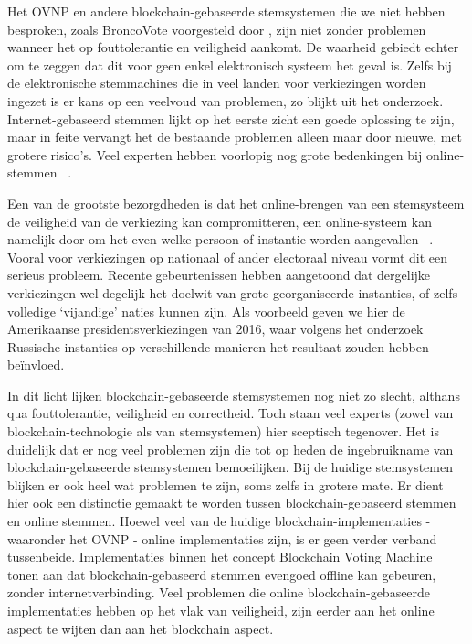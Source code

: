 	 Het OVNP en andere blockchain-gebaseerde stemsystemen die we niet hebben besproken, zoals BroncoVote voorgesteld door \textcite{Dagher2018}, zijn niet zonder problemen wanneer het op fouttolerantie en veiligheid aankomt. De waarheid gebiedt echter om te zeggen dat dit voor geen enkel elektronisch systeem het geval is. Zelfs bij de elektronische stemmachines die in veel landen voor verkiezingen worden ingezet is er kans op een veelvoud van problemen, zo blijkt uit het \textcite{Norden2015} onderzoek. Internet-gebaseerd stemmen lijkt op het eerste zicht een goede oplossing te zijn, maar in feite vervangt het de bestaande problemen alleen maar door nieuwe, met grotere risico's. Veel experten hebben voorlopig nog grote bedenkingen bij online-stemmen ~\autocite{Norden2015}. 
	 
	 Een van de grootste bezorgdheden is dat het online-brengen van een stemsysteem de veiligheid van de verkiezing kan compromitteren, een online-systeem kan namelijk door om het even welke persoon of instantie worden aangevallen ~\autocite{Norden2015}. Vooral voor verkiezingen op nationaal of ander electoraal niveau vormt dit een serieus probleem. Recente gebeurtenissen hebben aangetoond dat dergelijke verkiezingen wel degelijk het doelwit van grote georganiseerde instanties, of zelfs volledige `vijandige' naties kunnen zijn. Als voorbeeld geven we hier de Amerikaanse presidentsverkiezingen van 2016, waar volgens het \textcite{Mueller2019} onderzoek Russische instanties op verschillende manieren het resultaat zouden hebben beïnvloed.
	 
	 In dit licht lijken blockchain-gebaseerde stemsystemen nog niet zo slecht, althans qua fouttolerantie, veiligheid en correctheid. Toch staan veel experts (zowel van blockchain-technologie als van stemsystemen) hier sceptisch tegenover. Het is duidelijk dat er nog veel problemen zijn die tot op heden de ingebruikname van blockchain-gebaseerde stemsystemen bemoeilijken. Bij de huidige stemsystemen blijken er ook heel wat problemen te zijn, soms zelfs in grotere mate. Er dient hier ook een distinctie gemaakt te worden tussen blockchain-gebaseerd stemmen en online stemmen. Hoewel veel van de huidige blockchain-implementaties - waaronder het OVNP - online implementaties zijn, is er geen verder verband tussenbeide. Implementaties binnen het concept Blockchain Voting Machine tonen aan dat blockchain-gebaseerd stemmen evengoed offline kan gebeuren, zonder internetverbinding. Veel problemen die online blockchain-gebaseerde implementaties hebben op het vlak van veiligheid, zijn eerder aan  het online aspect te wijten dan aan het blockchain aspect.
	
